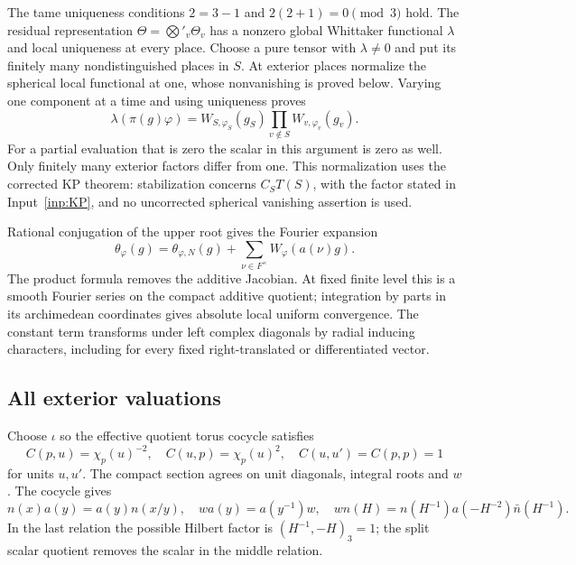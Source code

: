 \documentclass[11pt,a4paper]{article}
\numberwithin{equation}{section}
\theoremstyle{definition}
\theoremstyle{remark}
\begin{document}
The tame uniqueness conditions $2=3-1$ and $2(2+1)=0\pmod3$ hold. The residual representation $\Theta=\bigotimes'_v\Theta_v$ has a nonzero global Whittaker functional $\lambda$ and local uniqueness at every place. Choose a pure tensor with $\lambda\ne0$ and put its finitely many nondistinguished places in $S$. At exterior places normalize the spherical local functional at one, whose nonvanishing is proved below. Varying one component at a time and using uniqueness proves
\begin{equation}\label{eq:factorW}
 \lambda(\pi(g)\varphi)=W_{S,\varphi_S}(g_S)
                         \prod_{v\notin S}W_{v,\varphi_v}(g_v).
\end{equation}
For a partial evaluation that is zero the scalar in this argument is zero as well. Only finitely many exterior factors differ from one. This normalization uses the corrected KP theorem: stabilization concerns $C_ST(S)$, with the factor stated in Input~\ref{inp:KP}, and no uncorrected spherical vanishing assertion is used.

Rational conjugation of the upper root gives the Fourier expansion
\begin{equation}\label{eq:fourierTheta}
 \theta_\varphi(g)=\theta_{\varphi,N}(g)
        +\sum_{\nu\in F^\times}W_\varphi(a(\nu)g).
\end{equation}
The product formula removes the additive Jacobian. At fixed finite level this is a smooth Fourier series on the compact additive quotient; integration by parts in its archimedean coordinates gives absolute local uniform convergence. The constant term transforms under left complex diagonals by radial inducing characters, including for every fixed right-translated or differentiated vector.

\subsection{All exterior valuations}
Choose $\iota$ so the effective quotient torus cocycle satisfies
\[
 C(p,u)=\chi_p(u)^{-2},\quad C(u,p)=\chi_p(u)^2,\quad
 C(u,u')=C(p,p)=1
\]
for units $u,u'$. The compact section agrees on unit diagonals, integral roots and $w$ \cite[Proposition 0.1.3]{KP84}. The cocycle gives
\begin{equation}\label{eq:lifts}
 n(x)a(y)=a(y)n(x/y),\quad wa(y)=a(y^{-1})w,\quad
 wn(H)=n(H^{-1})a(-H^{-2})\bar n(H^{-1}).
\end{equation}
In the last relation the possible Hilbert factor is $(H^{-1},-H)_3=1$; the split scalar quotient removes the scalar in the middle relation.
\end{document}
